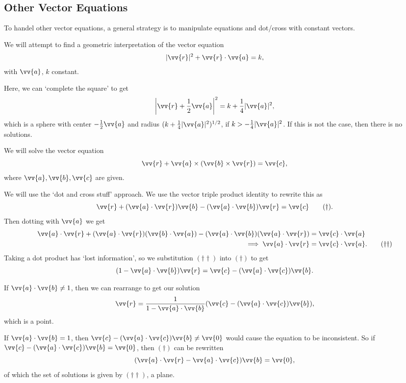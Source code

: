 \subsection{Other Vector Equations}

To handel other vector equations, a general strategy is to manipulate equations and dot/cross with constant vectors.

\begin{example}
    We will attempt to find a geometric interpretation of the vector equation
    $$
    |\vv{r}|^2 + \vv{r} \cdot \vv{a} = k,
    $$
    with $\vv{a}$, $k$ constant.

    Here, we can `complete the square' to get
    $$
    \left|\vv{r} + \frac{1}{2}\vv{a}\right|^2 = k + \frac{1}{4}|\vv{a}|^2,
    $$
    which is a sphere with center $-\frac{1}{2}\vv{a}$ and radius $(k + \frac{1}{4}|\vv{a}|^2)^{1/2}$, if $k > - \frac{1}{4}|\vv{a}|^2$. If this is not the case, then there is no solutions.
\end{example}

\begin{example}
    We will solve the vector equation
    $$
    \vv{r} + \vv{a} \times (\vv{b} \times \vv{r}) = \vv{c},
    $$
    where $\vv{a}, \vv{b}, \vv{c}$ are given.

    We will use the `dot and cross stuff' approach. We use the vector triple product identity to rewrite this as
    \begin{equation}
        \vv{r} + (\vv{a} \cdot \vv{r}) \vv{b} - (\vv{a} \cdot \vv{b})\vv{r} = \vv{c} \tag{$\dagger$}.
    \end{equation}
    Then dotting with $\vv{a}$ we get
    \begin{align*}
        \vv{a} \cdot \vv{r} + (\vv{a} \cdot \vv{r})(\vv{b} \cdot \vv{a}) - (\vv{a} \cdot \vv{b})(\vv{a} \cdot \vv{r}) &= \vv{c} \cdot \vv{a} \nonumber \\
\implies \vv{a} \cdot \vv{r} &= \vv{c} \cdot \vv{a}. \tag{$\dagger \dagger$}
    \end{align*}
    Taking a dot product has `lost information', so we substitution $(\dagger \dagger)$ into $(\dagger)$ to get
    $$
    (1 - \vv{a} \cdot \vv{b}) \vv{r} = \vv{c} - (\vv{a} \cdot \vv{c}) \vv{b}.
    $$

    If $\vv{a} \cdot \vv{b} \neq 1$, then we can rearrange to get our solution
    $$
        \vv{r} = \frac{1}{1 - \vv{a} \cdot \vv{b}} ( \vv{c} - (\vv{a} \cdot \vv{c}) \vv{b}),
    $$
    which is a point.

    If $\vv{a} \cdot \vv{b} = 1$, then $\vv{c} - (\vv{a} \cdot \vv{c})\vv{b} \neq \vv{0}$ would cause the equation to be inconsistent. So if $\vv{c} - (\vv{a} \cdot \vv{c})\vv{b} = \vv{0}$, then $(\dagger)$ can be rewritten
    $$
    (\vv{a} \cdot \vv{r} - \vv{a} \cdot \vv{c}) \vv{b} = \vv{0},
    $$
    of which the set of solutions is given by $(\dagger \dagger)$, a plane.
\end{example}


